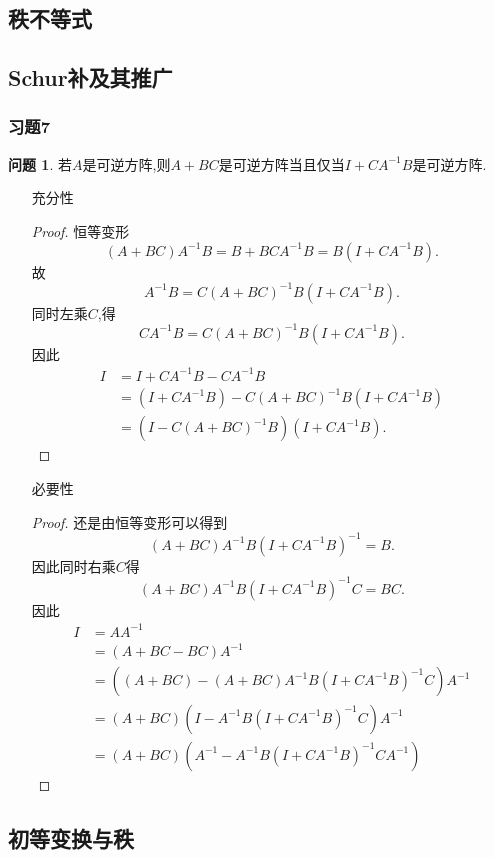 \documentclass[11pt]{ctexart}
\theoremstyle{definition}
\newtheorem{qqq}{问题}[section]
\numberwithin{equation}{section}
\begin{document}
\subsection{秩不等式}
\subsection{Schur补及其推广}
\subsubsection{习题7}
\begin{qqq}
    若$A$是可逆方阵,则$A+BC$是可逆方阵当且仅当$I+CA^{-1}B$是可逆方阵.
\end{qqq}
\begin{aaa}
\begin{itemize}
    \item [充分性]\begin{proof}
    恒等变形$$(A+BC)A^{-1}B=B+BCA^{-1}B=B(I+CA^{-1}B).$$
    故$$A^{-1}B=C(A+BC)^{-1}B(I+CA^{-1}B).$$
    同时左乘$C$,得$$CA^{-1}B=C(A+BC)^{-1}B(I+CA^{-1}B).$$
    因此\begin{align*}
        I&=I+CA^{-1}B-CA^{-1}B\\
        &=(I+CA^{-1}B)-C(A+BC)^{-1}B(I+CA^{-1}B)\\
        &=(I-C(A+BC)^{-1}B)(I+CA^{-1}B).
    \end{align*}
    \end{proof}
    \item [必要性]\begin{proof}
        还是由恒等变形可以得到$$(A+BC)A^{-1}B(I+CA^{-1}B)^{-1}=B.$$
        因此同时右乘$C$得$$(A+BC)A^{-1}B(I+CA^{-1}B)^{-1}C=BC.$$
        因此\begin{align*}
            I&=AA^{-1}\\
            &=(A+BC-BC)A^{-1}\\
            &=((A+BC)-(A+BC)A^{-1}B(I+CA^{-1}B)^{-1}C)A^{-1}\\
            &=(A+BC)(I-A^{-1}B(I+CA^{-1}B)^{-1}C)A^{-1}\\
            &=(A+BC)(A^{-1}-A^{-1}B(I+CA^{-1}B)^{-1}CA^{-1})
        \end{align*}
    \end{proof}
\end{itemize}
\end{aaa}
\subsection{初等变换与秩}
\end{document}
